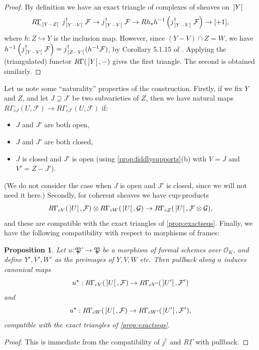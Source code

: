 \documentclass[cjm]{ipart}
\theoremstyle{plain}
\newtheorem{proposition}[theorem]{Proposition}
\theoremstyle{remark}
\DeclarePairedDelimiter{\tb}{{\,]}}{{[\, }} %
\newcommand{\cF}{\mathcal{F}}
\newcommand{\cO}{\mathcal{O}}
\newcommand{\fP}{\mathfrak{P}}
\newcommand{\into}{\hookrightarrow}
\newcommand{\uGa}{\underline{\Gamma}}
\numberwithin{equation}{subsection}
\begin{document}
  \begin{proof}
   By definition we have an exact triangle of complexes of sheaves on $\tb{Y}$
   \[
   R\uGa_{\tb{Y-Z}}\ j^\dagger_{\tb{Y-V}}\, \cF \to
   j^\dagger_{\tb{Y-V}}\, \cF \to
   Rh_\star h^{-1}\left( j^\dagger_{\tb{Y-V}}\, \cF\right) \to [+1],
   \]
   where $h: Z \into Y$ is the inclusion map. However, since $(Y - V) \cap Z = W$, we have $h^{-1}\left( j^\dagger_{\tb{Y-V}}\, \cF\right) = j^\dagger_{\tb{Z-V}}(h^{-1} \cF)$, by Corollary 5.1.15 of \cite{lestum07}. Applying the (triangulated) functor $R\Gamma(\tb{Y}, -)$ gives the first triangle. The second is obtained similarly.
  \end{proof}

  Let us note some ``naturality'' properties of the construction. Firstly, if we fix $Y$ and $Z$, and let $J \supseteq J'$ be two subvarieties of $Z$, then we have natural maps
  $R\Gamma_{cJ}(U, \cF) \to R\Gamma_{cJ'} (U, \cF)$ if:
  \begin{itemize}
   \item $J$ and $J'$ are both open,
   \item $J$ and $J'$ are both closed,
   \item $J$ is closed and $J'$ is open (using \cref{prop:fiddlysupports}(b) with $V = J$ and $V' = Z - J'$).
  \end{itemize}
  (We do not consider the case when $J$ is open and $J'$ is closed, since we will not need it here.) Secondly, for coherent sheaves we have cup-products
  \[  R\Gamma_{cV}(\tb{U}, \cF) \otimes R\Gamma_{cW}(\tb{U}, \mathcal{G}) \to R\Gamma_{cZ}(\tb{U}, \cF \otimes \mathcal{G}),\]
  and these are compatible with the exact triangles of \cref{prop:exactseqs}. Finally, we have the following compatibility with respect to morphisms of frames:

  \begin{proposition}
   \label{prop:pullback}
   Let $u: \fP' \to \fP$ be a morphism of formal schemes over $\cO_K$, and define $Y', V', W'$ as the preimages of $Y, V, W$ etc. Then pullback along $u$ induces canonical maps
   \[ u^\star: R\Gamma_{cV}(\tb{U}, \cF) \to R\Gamma_{cV'}(\tb{U'}, \cF') \]
   and
   \[ u^\star: R\Gamma_{cW}(\tb{U}, \cF) \to R\Gamma_{cW'}(\tb{U'}, \cF'),\]
   compatible with the exact triangles of \cref{prop:exactseqs}.
  \end{proposition}

  \begin{proof}
   This is immediate from the compatibility of $j^{\dagger}$ and $R\uGa$ with pullback.
  \end{proof}
\end{document}
